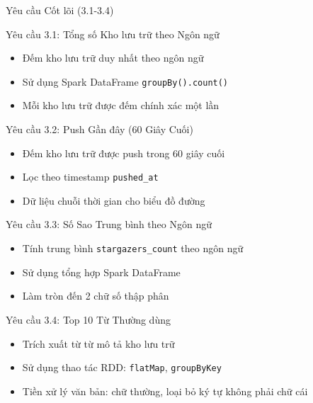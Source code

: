 \documentclass[aspectratio=169]{beamer}
\begin{document}
\begin{frame}{Yêu cầu Cốt lõi (3.1-3.4)}
    \begin{block}{Yêu cầu 3.1: Tổng số Kho lưu trữ theo Ngôn ngữ}
        \begin{itemize}
            \item Đếm kho lưu trữ duy nhất theo ngôn ngữ
            \item Sử dụng Spark DataFrame \texttt{groupBy().count()}
            \item Mỗi kho lưu trữ được đếm chính xác một lần
        \end{itemize}
    \end{block}
    
    \begin{block}{Yêu cầu 3.2: Push Gần đây (60 Giây Cuối)}
        \begin{itemize}
            \item Đếm kho lưu trữ được push trong 60 giây cuối
            \item Lọc theo timestamp \texttt{pushed\_at}
            \item Dữ liệu chuỗi thời gian cho biểu đồ đường
        \end{itemize}
    \end{block}
    
    \begin{block}{Yêu cầu 3.3: Số Sao Trung bình theo Ngôn ngữ}
        \begin{itemize}
            \item Tính trung bình \texttt{stargazers\_count} theo ngôn ngữ
            \item Sử dụng tổng hợp Spark DataFrame
            \item Làm tròn đến 2 chữ số thập phân
        \end{itemize}
    \end{block}
    
    \begin{block}{Yêu cầu 3.4: Top 10 Từ Thường dùng}
        \begin{itemize}
            \item Trích xuất từ từ mô tả kho lưu trữ
            \item Sử dụng thao tác RDD: \texttt{flatMap}, \texttt{groupByKey}
            \item Tiền xử lý văn bản: chữ thường, loại bỏ ký tự không phải chữ cái
        \end{itemize}
    \end{block}
\end{frame}
\end{document}
